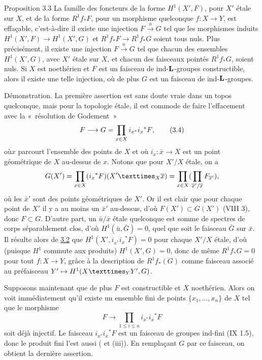 \documentclass[10pt]{../fichiers-configuration-latex/smfart}
\begin{document}
\begin{enonce*}{Proposition 3.3}
La famille des foncteurs de la forme $H^1(X',F)$, pour $X'$ étale sur
$X$, et de la forme $R^1f_{\ast}F$, pour un morphisme quelconque
$f:X\rightarrow Y$, est effaçable, c'est-à-dire il existe une
injection $F\xrightarrow{u}G$ tel que les morphismes induits
$H^1(X',F)\rightarrow H^1(X',G)$ et $R^1f_{\ast}F\rightarrow
R^1f_{\ast}G$ soient tous nuls. Plus précisément, il existe une
injection $F\xrightarrow{u}G$ tel que chacun des ensembles
$H^1(X',G)$, avec $X'$ étale sur $X$, et chacun des faisceaux pointés
$R^1f_{\ast}G$, soient nuls. Si $X$ est noethérien et $F$ est un
faisceau de ind-$\mathbf{L}$-groupes constructible, alors il existe
une telle injection, où de plus $G$ est un faisceau de
ind-$\mathbf{L}$-groupes.
\end{enonce*}

Démonstration. La première assertion est sans doute vraie dans un
topos quelconque, mais pour la topologie étale, il est commode de
faire l'effacement avec la « résolution de Godement » 
\begin{equation*}
F\longrightarrow G=\prod_{x\in X}i_{x^{\ast}}i_{x}{}^{\ast}F{},\tag{3.4}
\end{equation*}
où\pageoriginale $x$ parcourt l'ensemble des points de $X$ et où
$i_{x}:\bar{x}\rightarrow X$ est un point géométrique de $X$ au-dessus
de $x$. Notons que pour $X'/X$ étale, on a
$$
G(X')=\prod_{x\in
  X}(i_{x}{}^{\ast}F)(\fprod{X'}{\bar{x}}{X})=\prod_{x\in
  X}(\prod_{\bar{x}' /\bar{x}}F_{\bar{x}'}){\quoi},
$$
où les $\bar{x}'$ sont des points géométriques de $X'$. Or il est
clair que pour chaque point de $X'$ il y a au moins un $\bar{x}'$
au-dessus, d'où $F(X')\subset G(X')$ (VIII 3), donc $F\subset
G$. D'autre part, un $\bar{u}/\bar{x}$ étale quelconque est somme de
spectres de corps séparablement clos, d'où $H^1(\bar{u},\bar{G})=0$,
quel que soit le faisceau $\bar{G}$ sur $\bar{x}$. Il résulte alors de
\hyperref[XII.prop3.2]{3.2} que $H^1(X', i_{x^{\ast}}i_x{}^{\ast}F)=0$ pour chaque $X'/X$
étale, d'où (puisque $H^1$ commute aux produits) $H^1(X',G)=0$, donc
de même $R^1f_{\ast}G=0$ pour tout $f:X\rightarrow Y$, grâce à la
description de $R^1f_{\ast}(G)$ comme faisceau associé au préfaisceau
$Y'\mapsto H^1(\fprod{X}{Y'}{Y},G)$.

Supposons maintenant que de plus $F$ est constructible et $X$
noethérien. Alors on voit immédiatement qu'il existe un ensemble fini
de points $\{x_1,\ldots,x_n\}$ de $X$ tel que le morphisme
$$
F\longrightarrow \prod_{1\leq i\leq n}i_{x^{\ast}}i_{x}{}^{\ast}F
$$
soit déjà injectif. Le faisceau $i_{x^{\ast}}i_{x}{}^{\ast}F$ est
un faisceau de groupes ind-fini (IX 1.5), donc le produit fini l'est
aussi ( et  (iii)). 
En remplaçant $G$ par ce faisceau, on
obtient la dernière assertion.
\end{document}
